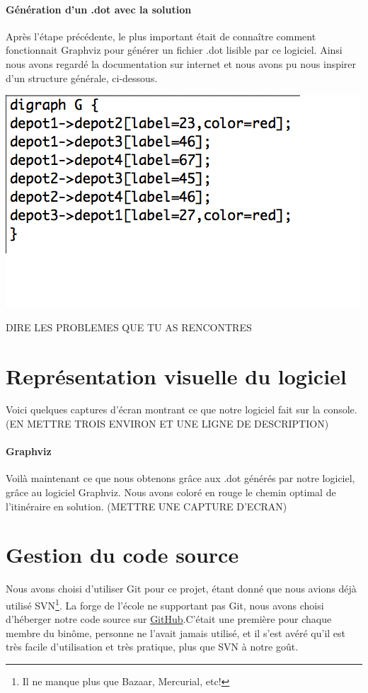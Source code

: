 \documentclass[12pt,a4paper]{report}
\begin{document}
\paragraph{Génération d'un .dot avec la solution}
Après l'étape précédente, le plus important était de connaître comment fonctionnait Graphviz pour générer un fichier .dot lisible par ce logiciel. Ainsi nous avons regardé la documentation sur internet et nous avons pu nous inspirer d'un structure générale, ci-dessous.
\begin{center}
\includegraphics[scale=0.4]{capture3.png}
\end{center}
DIRE LES PROBLEMES QUE TU AS RENCONTRES

\section{Représentation visuelle du logiciel}
Voici quelques captures d'écran montrant ce que notre logiciel fait sur la console. (EN METTRE TROIS ENVIRON ET UNE LIGNE DE DESCRIPTION)

\paragraph{Graphviz}
Voilà maintenant ce que nous obtenons grâce aux .dot générés par notre logiciel, grâce au logiciel Graphviz. Nous avons coloré en rouge le chemin optimal de l'itinéraire en solution.
(METTRE UNE CAPTURE D'ECRAN)

\section{Gestion du code source}
Nous avons choisi d'utiliser Git pour ce projet, \'{e}tant donn\'{e} que nous avions d\'{e}j\`{a} utilis\'{e} SVN\footnote{Il ne manque plus que Bazaar, Mercurial, etc!}. La forge de l'\'{e}cole ne supportant pas Git, nous avons choisi d'h\'{e}berger notre code source sur \href{https://github.com/Videl/Graph-Visualization-Manager}{GitHub}.C'était une première pour chaque membre du binôme, personne ne l'avait jamais utilisé, et il s'est avéré qu'il est très facile d'utilisation et très pratique, plus que SVN à notre goût.
\end{document}
